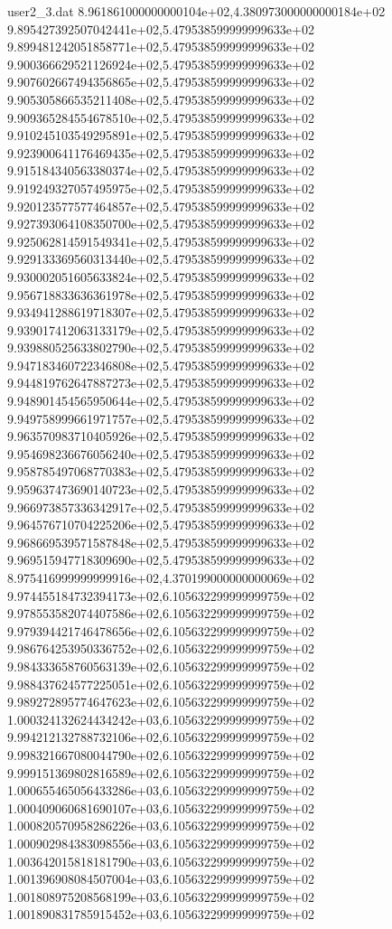 \begin{filecontents}{user2_3.dat}
8.961861000000000104e+02,4.380973000000000184e+02
9.895427392507042441e+02,5.479538599999999633e+02
9.899481242051858771e+02,5.479538599999999633e+02
9.900366629521126924e+02,5.479538599999999633e+02
9.907602667494356865e+02,5.479538599999999633e+02
9.905305866535211408e+02,5.479538599999999633e+02
9.909365284554678510e+02,5.479538599999999633e+02
9.910245103549295891e+02,5.479538599999999633e+02
9.923900641176469435e+02,5.479538599999999633e+02
9.915184340563380374e+02,5.479538599999999633e+02
9.919249327057495975e+02,5.479538599999999633e+02
9.920123577577464857e+02,5.479538599999999633e+02
9.927393064108350700e+02,5.479538599999999633e+02
9.925062814591549341e+02,5.479538599999999633e+02
9.929133369560313440e+02,5.479538599999999633e+02
9.930002051605633824e+02,5.479538599999999633e+02
9.956718833636361978e+02,5.479538599999999633e+02
9.934941288619718307e+02,5.479538599999999633e+02
9.939017412063133179e+02,5.479538599999999633e+02
9.939880525633802790e+02,5.479538599999999633e+02
9.947183460722346808e+02,5.479538599999999633e+02
9.944819762647887273e+02,5.479538599999999633e+02
9.948901454565950644e+02,5.479538599999999633e+02
9.949758999661971757e+02,5.479538599999999633e+02
9.963570983710405926e+02,5.479538599999999633e+02
9.954698236676056240e+02,5.479538599999999633e+02
9.958785497068770383e+02,5.479538599999999633e+02
9.959637473690140723e+02,5.479538599999999633e+02
9.966973857336342917e+02,5.479538599999999633e+02
9.964576710704225206e+02,5.479538599999999633e+02
9.968669539571587848e+02,5.479538599999999633e+02
9.969515947718309690e+02,5.479538599999999633e+02
8.975416999999999916e+02,4.370199000000000069e+02
9.974455184732394173e+02,6.105632299999999759e+02
9.978553582074407586e+02,6.105632299999999759e+02
9.979394421746478656e+02,6.105632299999999759e+02
9.986764253950336752e+02,6.105632299999999759e+02
9.984333658760563139e+02,6.105632299999999759e+02
9.988437624577225051e+02,6.105632299999999759e+02
9.989272895774647623e+02,6.105632299999999759e+02
1.000324132624434242e+03,6.105632299999999759e+02
9.994212132788732106e+02,6.105632299999999759e+02
9.998321667080044790e+02,6.105632299999999759e+02
9.999151369802816589e+02,6.105632299999999759e+02
1.000655465056433286e+03,6.105632299999999759e+02
1.000409060681690107e+03,6.105632299999999759e+02
1.000820570958286226e+03,6.105632299999999759e+02
1.000902984383098556e+03,6.105632299999999759e+02
1.003642015818181790e+03,6.105632299999999759e+02
1.001396908084507004e+03,6.105632299999999759e+02
1.001808975208568199e+03,6.105632299999999759e+02
1.001890831785915452e+03,6.105632299999999759e+02

\end{filecontents}

